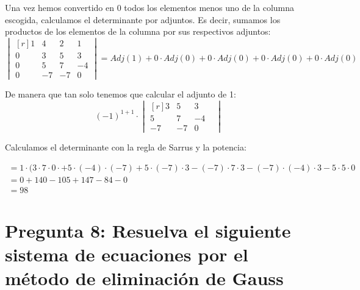 \documentclass[a4paper, apacite, 12pt, doc]{apa6}
\begin{document}
Una vez hemos convertido en 0 todos los elementos menos uno de la columna escogida, calculamos el determinante por adjuntos. Es decir, sumamos los productos de los elementos de la columna por sus respectivos adjuntos:
\[
\begin{vmatrix*}[r]
 1 &  4 & 2 & 1\\
 0 &  3 & 5 & 3\\
 0 &  5 & 7 & -4\\
 0 &  -7 & -7 & 0
\end{vmatrix*}
= Adj(1) + 0 \cdot Adj(0)  + 0 \cdot Adj(0) + 0 \cdot Adj(0) + 0 \cdot Adj(0)
\]

De manera que tan solo tenemos que calcular el adjunto de 1:
\[
(-1)^{1+1} \cdot
\begin{vmatrix*}[r]
	3& 5& 3& \\
	5& 7& -4& \\
	-7& -7& 0&
\end{vmatrix*}
\]


Calculamos el determinante con la regla de Sarrus y la potencia:

\begin{gather*}
	= 1 \cdot ( 3 \cdot 7 \cdot 0 \cdot + 5 \cdot (-4) \cdot (-7) + 5 \cdot (-7) \cdot 3 - (-7) \cdot 7 \cdot 3 -(-7) \cdot (-4) \cdot 3 -5 \cdot 5 \cdot 0 \\
	= 0 + 140 -105 +147 -84 -0 \\
	= 98
\end{gather*}

\section{Pregunta 8: Resuelva el siguiente sistema de ecuaciones por el método de eliminación de Gauss}
\end{document}
